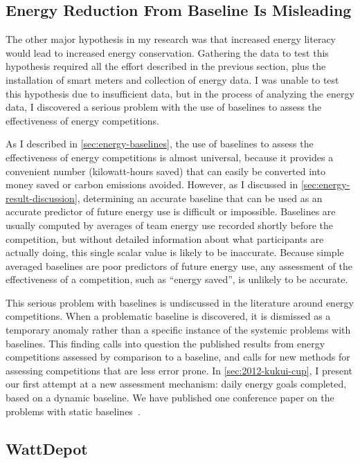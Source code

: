\subsection{Energy Reduction From Baseline Is Misleading}

The other major hypothesis in my research was that increased energy literacy would lead to increased energy conservation. Gathering the data to test this hypothesis required all the effort described in the previous section, plus the installation of smart meters and collection of energy data. I was unable to test this hypothesis due to insufficient data, but in the process of analyzing the energy data, I discovered a serious problem with the use of baselines to assess the effectiveness of energy competitions.

As I described in \autoref{sec:energy-baselines}, the use of baselines to assess the effectiveness of energy competitions is almost universal, because it provides a convenient number (kilowatt-hours saved) that can easily be converted into money saved or carbon emissions avoided. However, as I discussed in \autoref{sec:energy-result-discussion}, determining an accurate baseline that can be used as an accurate predictor of future energy use is difficult or impossible. Baselines are usually computed by averages of team energy use recorded shortly before the competition, but without detailed information about what participants are actually doing, this single scalar value is likely to be inaccurate. Because simple averaged baselines are poor predictors of future energy use, any assessment of the effectiveness of a competition, such as ``energy saved'', is unlikely to be accurate.

This serious problem with baselines is undiscussed in the literature around energy competitions. When a problematic baseline is discovered, it is dismissed as a temporary anomaly rather than a specific instance of the systemic problems with baselines. This finding calls into question the published results from energy competitions assessed by comparison to a baseline, and calls for new methods for assessing competitions that are less error prone. In \autoref{sec:2012-kukui-cup}, I present our first attempt at a new assessment mechanism: daily energy goals completed, based on a dynamic baseline. We have published one conference paper on the problems with static baselines~\cite{csdl2-12-08}.


\subsection{WattDepot}

